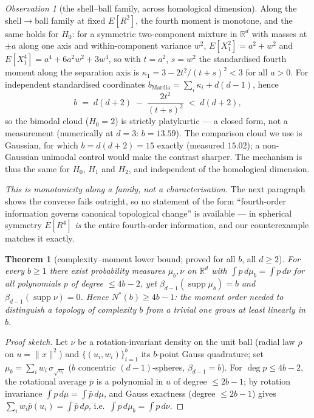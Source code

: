 \documentclass[11pt]{article}
\newtheorem{theorem}{Theorem}
\theoremstyle{remark}
\newtheorem{observation}{Observation}
\begin{document}
\begin{observation}[the shell--ball family, across homological dimension]
Along the shell$\to$ball family at fixed $E[R^2]$, the fourth moment is monotone, and the same
holds for $H_0$: for a symmetric two-component mixture in $\mathbb{R}^d$ with masses at $\pm a$
along one axis and within-component variance $w^2$, $E[X_1^2]=a^2+w^2$ and
$E[X_1^4]=a^4+6a^2w^2+3w^4$, so with $t=a^2$, $s=w^2$ the standardised
fourth moment along the separation axis is $\kappa_1=3-2t^2/(t+s)^2<3$ for all $a>0$. For
independent standardised coordinates $b_{\mathrm{Mardia}}=\sum_i\kappa_i+d(d-1)$, hence
\[
b \;=\; d(d+2)\;-\;\frac{2t^2}{(t+s)^2}\;<\;d(d+2),
\]
so the bimodal cloud ($H_0=2$) is strictly platykurtic --- a closed form, not a measurement
(numerically at $d=3$: $b=13.59$). The comparison cloud we use is Gaussian, for which
$b=d(d+2)=15$ exactly (measured $15.02$); a non-Gaussian unimodal control would make the
contrast sharper. The mechanism is thus the same for $H_0$, $H_1$ and $H_2$, and independent of the
homological dimension.

\emph{This is monotonicity along a family, not a characterisation.} The next paragraph shows the
converse fails outright, so no statement of the form ``fourth-order information governs canonical
topological change'' is available --- in spherical symmetry $E[R^4]$ \emph{is} the entire
fourth-order information, and our counterexample matches it exactly.
\end{observation}

\begin{theorem}[complexity--moment lower bound; proved for all $b$, all $d\ge2$]
For every $b\ge1$ there exist probability measures $\mu_b,\nu$ on $\mathbb{R}^d$ with
$\int p\,d\mu_b=\int p\,d\nu$ for all polynomials $p$ of degree $\le 4b-2$, yet
$\beta_{d-1}(\operatorname{supp}\mu_b)=b$ and $\beta_{d-1}(\operatorname{supp}\nu)=0$. Hence
$N^*(b)\ge 4b-1$: the moment order needed to distinguish a topology of complexity $b$ from a
trivial one grows at least linearly in $b$.
\end{theorem}

\begin{proof}[Proof sketch]
Let $\nu$ be a rotation-invariant density on the unit ball (radial law $\rho$ on $u=\lVert
x\rVert^2$) and $\{(u_i,w_i)\}_{i=1}^b$ its $b$-point Gauss quadrature; set
$\mu_b=\sum_i w_i\,\sigma_{\sqrt{u_i}}$ ($b$ concentric $(d{-}1)$-spheres, $\beta_{d-1}=b$). For
$\deg p\le 4b-2$, the rotational average $\bar p$ is a polynomial in $u$ of degree $\le 2b-1$; by
rotation invariance $\int p\,d\mu=\int\bar p\,d\mu$, and Gauss exactness (degree $\le 2b-1$) gives
$\sum_i w_i\bar p(u_i)=\int\bar p\,d\rho$, i.e.\ $\int p\,d\mu_b=\int p\,d\nu$.
\end{proof}
\end{document}
